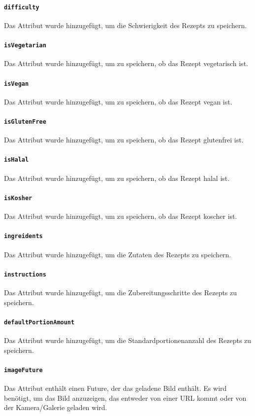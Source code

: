 \documentclass{implementierungsheft}
\begin{document}
\paragraph{\texttt{difficulty}}
Das Attribut wurde hinzugefügt, um die Schwierigkeit des Rezepts zu speichern.
\paragraph{\texttt{isVegetarian}}
Das Attribut wurde hinzugefügt, um zu speichern, ob das Rezept vegetarisch ist.
\paragraph{\texttt{isVegan}}
Das Attribut wurde hinzugefügt, um zu speichern, ob das Rezept vegan ist.
\paragraph{\texttt{isGlutenFree}}
Das Attribut wurde hinzugefügt, um zu speichern, ob das Rezept glutenfrei ist.
\paragraph{\texttt{isHalal}}
Das Attribut wurde hinzugefügt, um zu speichern, ob das Rezept halal ist.
\paragraph{\texttt{isKosher}}
Das Attribut wurde hinzugefügt, um zu speichern, ob das Rezept koscher ist.
\paragraph{\texttt{ingreidents}}
Das Attribut wurde hinzugefügt, um die Zutaten des Rezepts zu speichern.
\paragraph{\texttt{instructions}}
Das Attribut wurde hinzugefügt, um die Zubereitungsschritte des Rezepts zu speichern.
\paragraph{\texttt{defaultPortionAmount}}
Das Attribut wurde hinzugefügt, um die Standardportionenanzahl des Rezepts zu speichern.
\paragraph{\texttt{imageFuture}}
Das Attribut enthält einen Future, der das geladene Bild enthält. Es wird benötigt, um das Bild anzuzeigen, das entweder von einer URL kommt oder von der Kamera/Galerie geladen wird.
\end{document}
